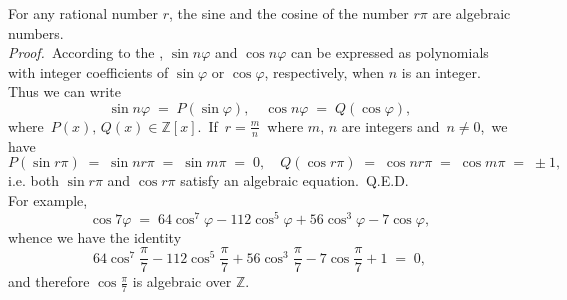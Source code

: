\documentclass[12pt]{article}
\theoremstyle{definition}
\begin{document}
For any rational number $r$, the sine and the cosine of the number $r\pi$ are algebraic numbers.\\

\emph{Proof.}\, According to the , $\sin{n\varphi}$ and $\cos{n\varphi}$ can be expressed as polynomials with integer coefficients of $\sin\varphi$ or $\cos\varphi$, respectively, when $n$ is an integer.\, Thus we can write 
$$\sin{n\varphi} \;=\; P(\sin\varphi), \quad \cos{n\varphi} \;=\; Q(\cos\varphi),$$
where\, $P(x),\,Q(x) \in \mathbb{Z}[x]$.\, If\, $\displaystyle r = \frac{m}{n}$\, where $m,\,n$ are integers and\, 
$n \neq 0$,\, we have
$$P(\sin{r\pi}) \;=\; \sin{nr\pi} \;=\; \sin{m\pi} \;=\; 0, \quad
  Q(\cos{r\pi}) \;=\; \cos{nr\pi} \;=\; \cos{m\pi} \;=\; \pm1,$$
i.e. both $\sin{r\pi}$ and $\cos{r\pi}$ satisfy an algebraic equation.\, Q.E.D.\\


For example,
$$\cos{7\varphi} \;=\; 64\cos^7\varphi-112\cos^5\varphi+56\cos^3\varphi-7\cos\varphi,$$
whence we have the identity
$$64\cos^7\frac{\pi}{7}-112\cos^5\frac{\pi}{7}+56\cos^3\frac{\pi}{7}-7\cos\frac{\pi}{7}+1 \;=\; 0,$$
and therefore $\cos\frac{\pi}{7}$ is algebraic over $\mathbb{Z}$.

\end{document}
